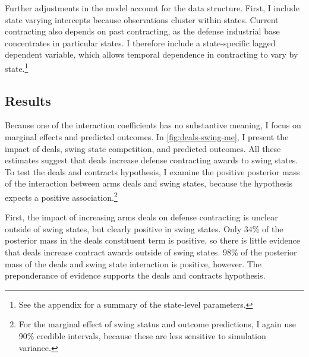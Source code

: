 \documentclass[12pt]{article}
\begin{document}
Further adjustments in the model account for the data structure.
First, I include state varying intercepts because observations cluster within states. 
Current contracting also depends on past contracting, as the defense industrial base concentrates in particular states. 
I therefore include a state-specific lagged dependent variable, which allows temporal dependence in contracting to vary by state.\footnote{See the appendix for a summary of the state-level parameters.}






\subsection{Results}


Because one of the interaction coefficients has no substantive meaning, I focus on marginal effects and predicted outcomes.
In \autoref{fig:deals-swing-me}, I present the impact of deals, swing state competition, and predicted outcomes.
All these estimates suggest that deals increase defense contracting awards to swing states. 
To test the deals and contracts hypothesis, I examine the positive posterior mass of the interaction between arms deals and swing states, because the hypothesis expects a positive association.\footnote{For the marginal effect of swing status and outcome predictions, I again use 90\% credible intervals, because these are less sensitive to simulation variance.}


First, the impact of increasing arms deals on defense contracting is unclear outside of swing states, but clearly positive in swing states. 
Only 34\% of the posterior mass in the deals constituent term is positive, so there is little evidence that deals increase contract awards outside of swing states. 
98\% of the posterior mass of the deals and swing state interaction is positive, however. 
The preponderance of evidence supports the deals and contracts hypothesis.
\end{document}
